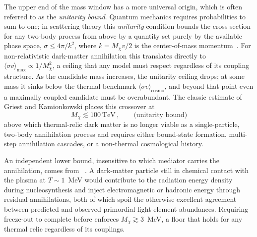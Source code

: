 The upper end of the mass window has a more universal origin, which is often referred to as the \emph{unitarity bound}.
Quantum mechanics requires probabilities to sum to one; in scattering theory this \emph{unitarity} condition bounds the cross section for any two-body process from above by a quantity set purely by the available phase space, $\sigma \leq 4\pi/k^2$, where $k = M_\chi v/2$ is the center-of-mass momentum~\cite{Griest:1989wd}.
For non-relativistic dark-matter annihilation this translates directly to $\langle \sigma v \rangle_\mathrm{max} \propto 1/M_\chi^2$, a ceiling that any model must respect regardless of its coupling structure.
As the candidate mass increases, the unitarity ceiling drops; at some mass it sinks below the thermal benchmark $\langle \sigma v \rangle_\mathrm{cosmo}$, and beyond that point even a maximally coupled candidate must be overabundant.
The classic estimate of Griest and Kamionkowski places this crossover at~\cite{Griest:1989wd}
\begin{equation}
	M_\chi \lesssim 100~\mathrm{TeV}\,, \qquad \text{(unitarity bound)}
	\label{eq:unitarity}
\end{equation}
above which thermal-relic dark matter is no longer viable as a single-particle, two-body annihilation process and requires either bound-state formation, multi-step annihilation cascades, or a non-thermal cosmological history.


An independent lower bound, insensitive to which mediator carries the annihilation, comes from \BBN~\cite{Nollett:2014lwa}.
A dark-matter particle still in chemical contact with the plasma at $T \sim 1$~MeV would contribute to the radiation energy density during nucleosynthesis and inject electromagnetic or hadronic energy through residual annihilations, both of which spoil the otherwise excellent agreement between predicted and observed primordial light-element abundances.
Requiring freeze-out to complete before \BBN enforces $M_\chi \gtrsim 3$~MeV, a floor that holds for any thermal relic regardless of its couplings.

